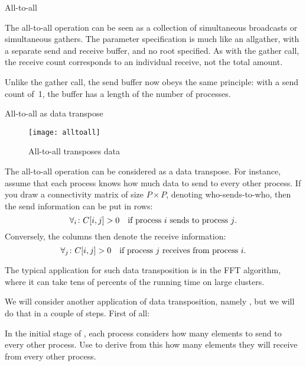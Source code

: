 
 {All-to-all}
\label{sec:alltoall}

The all-to-all operation
%
%
can be seen as a collection of simultaneous
broadcasts or simultaneous gathers. The parameter specification is much
like an allgather, with a separate send and receive buffer, and no
root specified. As with the gather call, the receive count corresponds
to an individual receive, not the total amount.

Unlike the gather call, the send buffer now obeys the same principle:
with a send count of~1, the buffer has a length of the number of
processes.

 {All-to-all as data transpose}
\label{sec:alltoall-transpose}

\begin{figure}[ht]
  \texttt{[image: alltoall]}
  \caption{All-to-all transposes data}
  \label{fig:alltoall}
\end{figure}

The all-to-all operation can be considered as a data transpose. For
instance, assume that each process knows how much data to send to
every other process. If you draw a connectivity matrix of size $P\times P$,
denoting who-sends-to-who, then the send information can be put in
rows:
\[ \forall_i\colon C[i,j]>0\quad\hbox{if process $i$ sends to process $j$}. \]
Conversely, the columns then denote the receive information:
\[ \forall_j\colon C[i,j]>0\quad\hbox{if process $j$ receives from process $i$}. \]

The typical application for such data transposition is in the \ac{FFT}
algorithm, where it can take tens of percents of the running time on
large clusters.

We will consider
another application of data transposition, namely ,
but we will do that in a couple of steps. First of all:

\begin{exercise}
  \label{ex:radixsort1}
  In the initial stage of , each process
  considers how many elements to send to every other process.
  Use  to derive from this how many
  elements they will receive from every other process.
\end{exercise}

